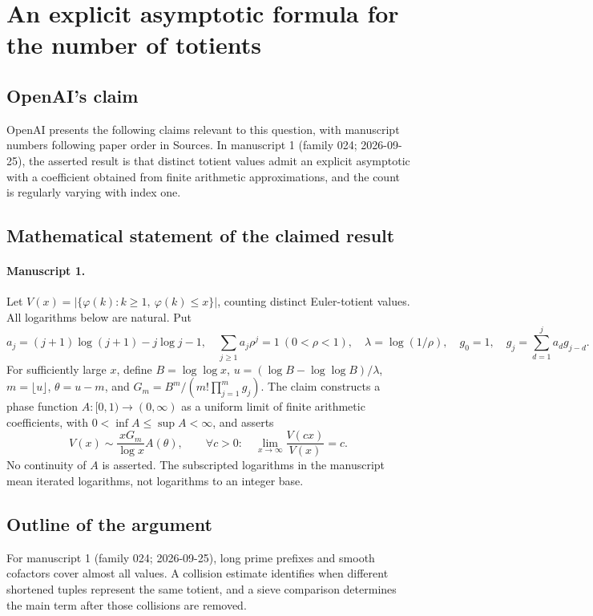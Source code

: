 \documentclass[11pt]{article}
\begin{document}
\section*{An explicit asymptotic formula for the number of totients}

\subsection{OpenAI's claim}
OpenAI presents the following claims relevant to this question, with manuscript numbers following paper order in Sources. In manuscript 1 (family 024; 2026-09-25), the asserted result is that distinct totient values admit an explicit asymptotic with a coefficient obtained from finite arithmetic approximations, and the count is regularly varying with index one.

\subsection{Mathematical statement of the claimed result}
\paragraph{Manuscript 1.}
Let $V(x)=|\{\varphi(k):k\ge1,\ \varphi(k)\le x\}|$, counting distinct Euler-totient values. All logarithms below are natural. Put
\[
 a_j=(j+1)\log(j+1)-j\log j-1,\quad
 \sum_{j\ge1}a_j\rho^j=1\ (0<\rho<1),\quad\lambda=\log(1/\rho),
 \quad g_0=1,\quad g_j=\sum_{d=1}^ja_dg_{j-d}.
\]
For sufficiently large $x$, define $B=\log\log x$, $u=(\log B-\log\log B)/\lambda$, $m=\lfloor u\rfloor$, $\theta=u-m$, and $G_m=B^m/(m!\prod_{j=1}^mg_j)$. The claim constructs a phase function $A:[0,1)\to(0,\infty)$ as a uniform limit of finite arithmetic coefficients, with $0<\inf A\le\sup A<\infty$, and asserts
\[
 V(x)\sim\frac{xG_m}{\log x}A(\theta),\qquad
 \forall c>0:\quad\lim_{x\to\infty}\frac{V(cx)}{V(x)}=c.
\]
No continuity of $A$ is asserted. The subscripted logarithms in the manuscript mean iterated logarithms, not logarithms to an integer base.

\subsection{Outline of the argument}
For manuscript 1 (family 024; 2026-09-25), long prime prefixes and smooth cofactors cover almost all values. A collision estimate identifies when different shortened tuples represent the same totient, and a sieve comparison determines the main term after those collisions are removed.
\end{document}
